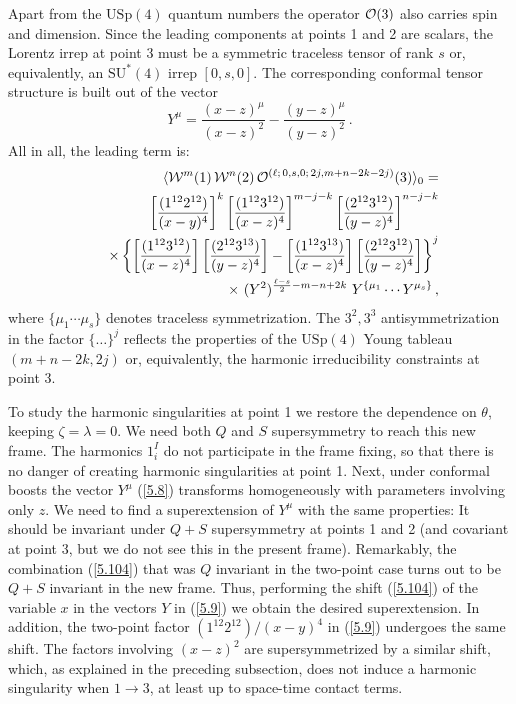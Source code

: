 \documentclass[a4paper,11pt]{article}
\begin{document}
Apart from the $\mbox{USp}(4)$ quantum numbers the operator ${\cal
O}(3)$ also carries spin and dimension. Since the leading
components at points 1 and 2 are scalars, the Lorentz irrep at
point 3 must be a symmetric traceless tensor of rank $s$ or,
equivalently, an $\mbox{SU}^*(4)$ irrep $[0,s,0]$. The
corresponding conformal tensor structure is built out of the
vector
\begin{equation}\label{5.8}
  Y^\mu = \frac{(x-z)^\mu}{(x-z)^2} - \frac{(y-z)^\mu}{(y-z)^2} \,.
\end{equation}
All in all, the leading term is:
\begin{eqnarray}
 &&\hskip-1.5cm \langle {\cal W}^m(1) \, \nonumber
  {\cal W}^n(2) \,
  {\cal O}^{(\ell; \, 0, s, 0; \, 2j, m+n-2k-2j)}(3)\rangle_{0} = \\
 &&\quad \left[\frac{(1^{12}2^{12})}{(x-y)^4}\right]^k
  \left[\frac{(1^{12}3^{12})}{(x-z)^4}\right]^{m-j-k}
   \left[\frac{(2^{12}3^{12})}{(y-z)^4}\right]^{n-j-k} \nonumber\\
  &&\quad \times \left\{\left[\frac{(1^{12}3^{12})}{(x-z)^4}\right]
   \left[\frac{(2^{12}3^{13})}{(y-z)^4}\right]
  - \left[\frac{(1^{12}3^{13})}{(x-z)^4}\right]
   \left[\frac{(2^{12}3^{12})}{(y-z)^4}\right]\right\}^j  \nonumber\\
  &&\quad \times\ (Y^2)^{\frac{\ell-s}{2}-m-n+2k}\ Y^{\{\mu_1}\cdots
  Y^{\mu_s\}} \, ,  \label{5.9}
\end{eqnarray}
where $\{\mu_1\cdots\mu_s\}$ denotes traceless symmetrization. The $3^2,3^3$
antisymmetrization in the factor $\{ \ldots \}^j$ reflects the properties of
the $\mbox{USp}(4)$ Young tableau $(m+n-2k,2j)$ or, equivalently, the harmonic
irreducibility constraints at point 3.

To study the harmonic singularities at point 1 we restore the
dependence on $\theta$, keeping $\zeta = \lambda = 0$. We need
both $Q$ and $S$ supersymmetry to reach this new frame. The
harmonics $1^I_i$ do not participate in the frame fixing, so that
there is no danger of creating harmonic singularities at point 1.
Next, under conformal boosts the vector $Y^\mu$ (\ref{5.8})
transforms homogeneously with parameters involving only $z$. We
need to find a superextension of $Y^\mu$ with the same properties:
It should be invariant under $Q+S$ supersymmetry at points 1 and 2
(and covariant at point 3, but we do not see this in the present
frame). Remarkably, the combination (\ref{5.104}) that was $Q$
invariant in the two-point case turns out to be $Q+S$ invariant in
the new frame. Thus, performing the shift (\ref{5.104}) of the
variable $x$ in the vectors $Y$ in (\ref{5.9}) we obtain the
desired superextension. In addition, the two-point factor $(1^{12}
2^{12})/(x-y)^4$ in (\ref{5.9}) undergoes the same shift. The
factors involving $(x-z)^2$ are supersymmetrized by a similar
shift, which, as explained in the preceding subsection, does not
induce a harmonic singularity when $1 \rightarrow 3$, at least up
to space-time contact terms.
\end{document}
